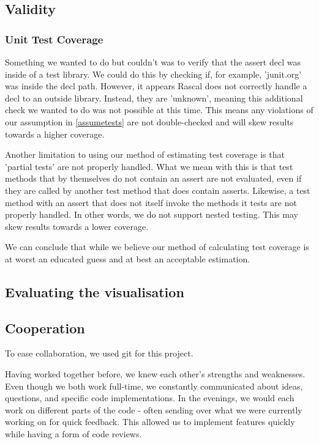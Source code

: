 \documentclass{article}
\begin{document}
\subsection{Validity}

\subsubsection{Unit Test Coverage}
Something we wanted to do but couldn't was to verify that the assert decl was inside of a test library. We could do this by checking if, for example, 'junit.org' was inside the decl path. However, it appears Rascal does not correctly handle a decl to an outside library. Instead, they are 'unknown', meaning this additional check we wanted to do was not possible at this time. This means any violations of our assumption in \ref{assumetests} are not double-checked and will skew results towards a higher coverage.

Another limitation to using our method of estimating test coverage is that 'partial tests' are not properly handled. What we mean with this is that test methods that by themselves do not contain an assert are not evaluated, even if they are called by another test method that does contain asserts. Likewise, a test method with an assert that does not itself invoke the methods it tests are not properly handled.
In other words, we do not support nested testing. This may skew results towards a lower coverage.

We can conclude that while we believe our method of calculating test coverage is at worst an educated guess and at best an acceptable estimation.

\subsection{Evaluating the visualisation}

\subsection{Cooperation}
To ease collaboration, we used git for this project.

Having worked together before, we knew each other's strengths and weaknesses. Even though we both work full-time, we constantly communicated about ideas, questions, and specific code implementations. 
In the evenings, we would each work on different parts of the code - often sending over what we were currently working on for quick feedback. This allowed us to implement features quickly while having a form of code reviews.
\end{document}
